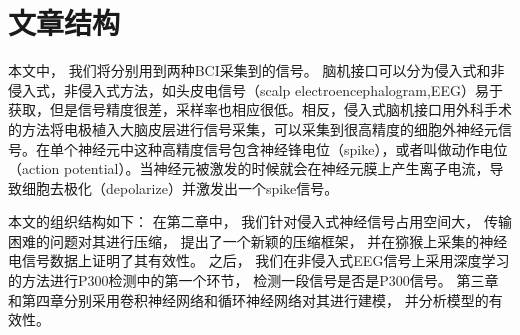 \section{文章结构}
本文中， 我们将分别用到两种BCI采集到的信号。 脑机接口可以分为侵入式和非侵入式，非侵入式方法，如头皮电信号（scalp electroencephalogram,EEG）易于获取，但是信号精度很差，采样率也相应很低。相反，侵入式脑机接口用外科手术的方法将电极植入大脑皮层进行信号采集，可以采集到很高精度的细胞外神经元信号。在单个神经元中这种高精度信号包含神经锋电位（spike），或者叫做动作电位（action potential）。当神经元被激发的时候就会在神经元膜上产生离子电流，导致细胞去极化（depolarize）并激发出一个spike信号。

本文的组织结构如下： 在第二章中， 我们针对侵入式神经信号占用空间大， 传输困难的问题对其进行压缩， 提出了一个新颖的压缩框架， 并在猕猴上采集的神经电信号数据上证明了其有效性。 之后， 我们在非侵入式EEG信号上采用深度学习的方法进行P300检测中的第一个环节， 检测一段信号是否是P300信号。 第三章和第四章分别采用卷积神经网络和循环神经网络对其进行建模， 并分析模型的有效性。









